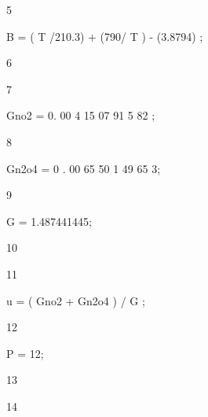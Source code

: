 \documentclass[a4paper,portrait,12pt]{article}
\begin{document}
5





\begin{flushleft}
B = ( T /210.3) + (790/ T ) - (3.8794) ;
\end{flushleft}





6


7





\begin{flushleft}
Gno2 = 0. 00 4 15 07 91 5 82 ;
\end{flushleft}





8





\begin{flushleft}
Gn2o4 = 0 . 00 65 50 1 49 65 3;
\end{flushleft}





9





\begin{flushleft}
G = 1.487441445;
\end{flushleft}





10


11





\begin{flushleft}
u = ( Gno2 + Gn2o4 ) / G ;
\end{flushleft}





12





\begin{flushleft}
P = 12;
\end{flushleft}





13


14
\end{document}
